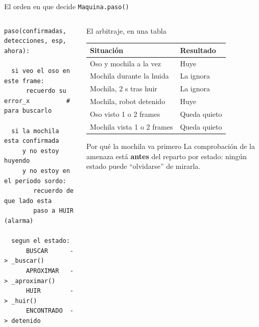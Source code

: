 \begin{frame}[fragile]{El orden en que decide \texttt{Maquina.paso()}}
\begin{columns}[T,onlytextwidth]
\begin{column}{0.56\textwidth}
\footnotesize
\begin{verbatim}
paso(confirmadas, detecciones, esp, ahora):

  si veo el oso en este frame:
      recuerdo su error_x          # para buscarlo

  si la mochila esta confirmada
     y no estoy huyendo
     y no estoy en el periodo sordo:
        recuerdo de que lado esta
        paso a HUIR (alarma)

  segun el estado:
      BUSCAR      -> _buscar()
      APROXIMAR   -> _aproximar()
      HUIR        -> _huir()
      ENCONTRADO  -> detenido
\end{verbatim}
\end{column}
\begin{column}{0.42\textwidth}
\footnotesize
\begin{block}{El arbitraje, en una tabla}
\begin{tabular}{L{3.25cm}L{1.9cm}}
  \toprule
  \textbf{Situación} & \textbf{Resultado} \\
  \midrule
  Oso y mochila a la vez & Huye \\
  Mochila durante la huida & La ignora \\
  Mochila, 2 s tras huir & La ignora \\
  Mochila, robot detenido & Huye \\
  Oso visto 1 o 2 frames & Queda quieto \\
  Mochila vista 1 o 2 frames & Queda quieto \\
  \bottomrule
\end{tabular}
\end{block}
\begin{block}{Por qué la mochila va primero}
  La comprobación de la amenaza está \textbf{antes} del reparto por estado:
  ningún estado puede ``olvidarse'' de mirarla.
\end{block}
\end{column}
\end{columns}
\end{frame}

